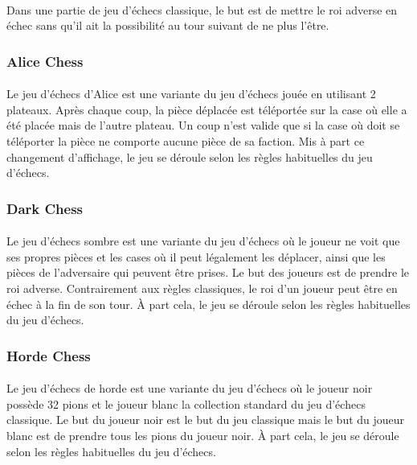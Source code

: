 \documentclass[10pt, a4paper]{article}
\begin{document}
					\paragraph{}Dans une partie de jeu d'échecs classique, le but est de mettre le roi adverse en échec sans qu'il ait la possibilité au tour suivant de ne plus l'être.
				\subsubsection{Alice Chess}
					\paragraph{}Le jeu d'échecs d'Alice est une variante du jeu d'échecs jouée en utilisant 2 plateaux. Après chaque coup, la pièce déplacée est téléportée sur la case où elle a été placée mais de l'autre plateau. Un coup n'est valide que si la case où doit se téléporter la pièce ne comporte aucune pièce de sa faction. Mis à part ce changement d'affichage, le jeu se déroule selon les règles habituelles du jeu d'échecs.
				\subsubsection{Dark Chess}
					\paragraph{} Le jeu d'échecs sombre est une variante du jeu d'échecs où le joueur ne voit que ses propres pièces et les cases où il peut légalement les déplacer, ainsi que les pièces de l'adversaire qui peuvent être prises. Le but des joueurs est de prendre le roi adverse. Contrairement aux règles classiques, le roi d'un joueur peut être en échec à la fin de son tour. À part cela, le jeu se déroule selon les règles habituelles du jeu d'échecs.
				\subsubsection{Horde Chess}
					\paragraph{} Le jeu d'échecs de horde est une variante du jeu d'échecs où le joueur noir possède 32 pions et le joueur blanc la collection standard du jeu d'échecs classique. Le but du joueur noir est le but du jeu classique mais le but du joueur blanc est de prendre tous les pions du joueur noir. À part cela, le jeu se déroule selon les règles habituelles du jeu d'échecs.
\end{document}
